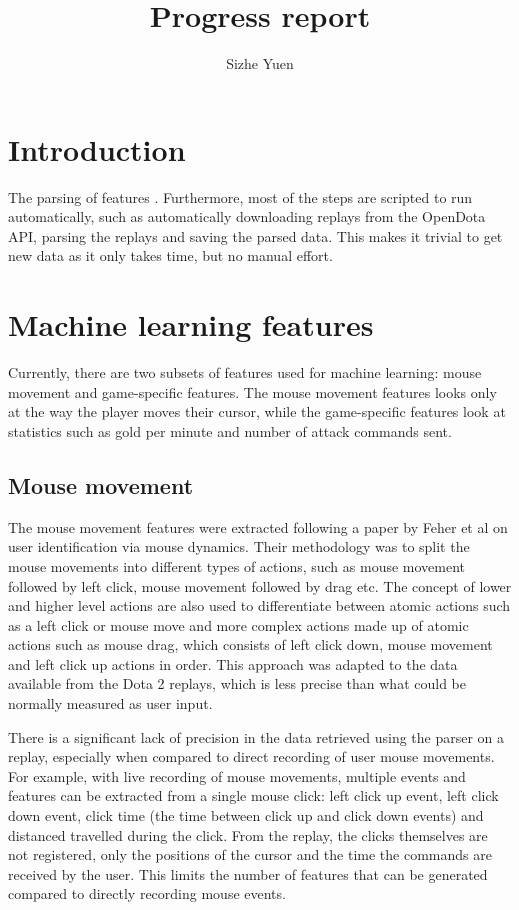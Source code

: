 \documentclass{../sty/SizheArticle}
\title{Progress report}
\author{Sizhe Yuen}
\begin{document}

\section{Introduction}
The parsing of features . Furthermore, most of the steps are scripted to run automatically, such as automatically downloading replays from the OpenDota API, parsing the replays and saving the parsed data. This makes it trivial to get new data as it only takes time, but no manual effort. 

\section{Machine learning features}
Currently, there are two subsets of features used for machine learning: mouse movement and game-specific features. The mouse movement features looks only at the way the player moves their cursor, while the game-specific features look at statistics such as gold per minute and number of attack commands sent. 

\subsection{Mouse movement}
The mouse movement features were extracted following a paper by Feher et al \cite{mouse-dynamics} on user identification via mouse dynamics. Their methodology was to split the mouse movements into different types of actions, such as mouse movement followed by left click, mouse movement followed by drag etc. The concept of lower and higher level actions are also used to differentiate between atomic actions such as a left click or mouse move and more complex actions made up of atomic actions such as mouse drag, which consists of left click down, mouse movement and left click up actions in order. This approach was adapted to the data available from the Dota 2 replays, which is less precise than what could be normally measured as user input. 

There is a significant lack of precision in the data retrieved using the parser on a replay, especially when compared to direct recording of user mouse movements. For example, with live recording of mouse movements, multiple events and features can be extracted from a single mouse click: left click up event, left click down event, click time (the time between click up and click down events) and distanced travelled during the click. From the replay, the clicks themselves are not registered, only the positions of the cursor and the time the commands are received by the user. This limits the number of features that can be generated compared to directly recording mouse events.
\end{document}
